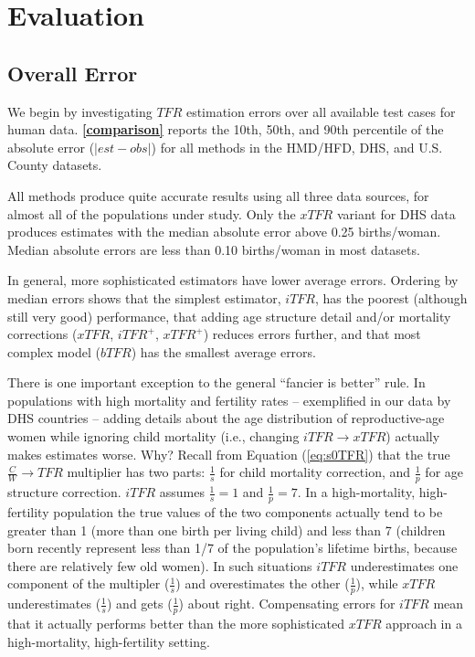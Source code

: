 \documentclass[12pt]{article}
\begin{document}
\hypertarget{evaluation}{%
\section{Evaluation}\label{evaluation}}

\hypertarget{overall-error}{%
\subsection{Overall Error}\label{overall-error}}

We begin by investigating \(TFR\) estimation errors over all available
test cases for human data. \textbf{\autoref{comparison}} reports the
10th, 50th, and 90th percentile of the absolute error
(\(\left| est-obs \right|\)) for all methods in the HMD/HFD, DHS, and
U.S. County datasets.

All methods produce quite accurate results using all three data sources,
for almost all of the populations under study. Only the \(xTFR\) variant
for DHS data produces estimates with the median absolute error above
0.25 births/woman. Median absolute errors are less than 0.10
births/woman in most datasets.

In general, more sophisticated estimators have lower average errors.
Ordering by median errors shows that the simplest estimator, \(iTFR\),
has the poorest (although still very good) performance, that adding age
structure detail and/or mortality corrections (\(xTFR\), \(iTFR^+\),
\(xTFR^+\)) reduces errors further, and that most complex model
(\(bTFR\)) has the smallest average errors.

There is one important exception to the general ``fancier is better''
rule. In populations with high mortality and fertility rates --
exemplified in our data by DHS countries -- adding details about the age
distribution of reproductive-age women while ignoring child mortality
(i.e., changing \(iTFR \rightarrow xTFR\)) actually makes estimates
worse. Why? Recall from Equation (\ref{eq:s0TFR}) that the true
\(\tfrac{C}{W}\rightarrow TFR\) multiplier has two parts:
\(\tfrac{1}{s}\) for child mortality correction, and \(\tfrac{1}{p}\)
for age structure correction. \(iTFR\) assumes \(\tfrac{1}{s}=1\) and
\(\tfrac{1}{p}=7\). In a high-mortality, high-fertility population the
true values of the two components actually tend to be greater than 1
(more than one birth per living child) and less than 7 (children born
recently represent less than 1/7 of the population's lifetime births,
because there are relatively few old women). In such situations \(iTFR\)
underestimates one component of the multipler (\(\tfrac{1}{s}\)) and
overestimates the other (\(\tfrac{1}{p}\)), while \(xTFR\)
underestimates (\(\tfrac{1}{s}\)) and gets (\(\tfrac{1}{p}\)) about
right. Compensating errors for \(iTFR\) mean that it actually performs
better than the more sophisticated \(xTFR\) approach in a
high-mortality, high-fertility setting.
\end{document}
